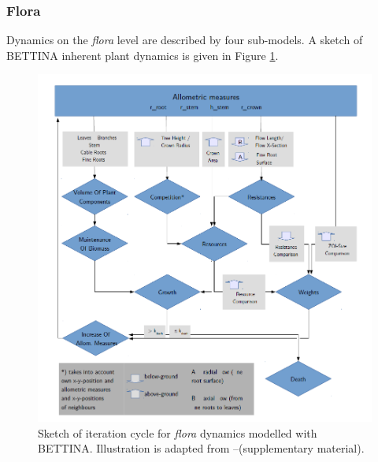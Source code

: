 \documentclass[manusscript, 12p, authoryear]{elsarticle}
\begin{document}
\subsubsection{Flora}
Dynamics on the \textit{flora} level are described by four sub-models.
A sketch of BETTINA inherent plant dynamics is given in Figure \ref{fig_bettina_sketch}.
\begin{figure}[h]\centering
\includegraphics[width=.8\textwidth]{bettina_sketch.png} 
\caption{Sketch of iteration cycle for \textit{flora} dynamics modelled with BETTINA. Illustration is adapted from \citet{Ronny2014}--(supplementary material).}\label{fig_bettina_sketch}
\end{figure} 
\end{document}
